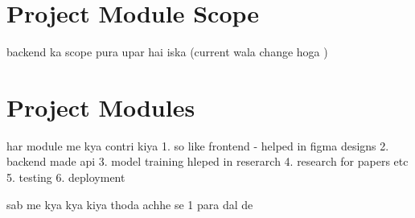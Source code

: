 \documentclass[openany]{report}
\begin{document}
\section{Project Module Scope}
backend ka scope pura upar hai iska (current wala change hoga )
\section{Project Modules}
har module me kya contri kiya
1. so like frontend - helped in figma designs
2. backend made api
3. model training hleped in reserarch
4. research for papers etc
5. testing
6. deployment

sab me kya kya kiya thoda achhe se 1 para dal de
\end{document}
